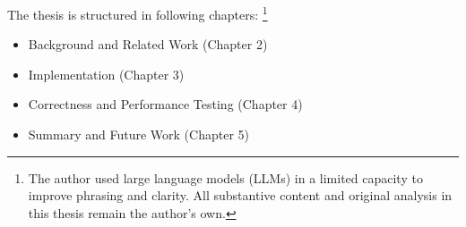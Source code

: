 The thesis is structured in following chapters: \footnote{The author used large language models (LLMs) in a limited capacity to improve phrasing and clarity. All substantive content and original analysis in this thesis remain the author's own.}

\begin{itemize}
  \item Background and Related Work (Chapter 2)
  \item Implementation (Chapter 3)
  \item Correctness and Performance Testing (Chapter 4)
  \item Summary and Future Work (Chapter 5)
\end{itemize}
